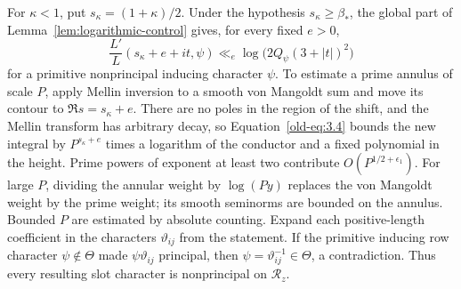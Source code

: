 \documentclass[12pt]{article}
\begin{document}
For \(\kappa<1\), put \(s_\kappa=(1+\kappa)/2\).  Under the hypothesis
\(s_\kappa\ge\beta_*\), the global part of
Lemma~\ref{lem:logarithmic-control} gives, for every fixed \(e>0\),
\begin{equation}
 \frac{L'}{L}(s_\kappa+e+it,\psi)
 \ll_e \log\!\bigl(2Q_\psi(3+|t|)^2\bigr)
 \label{old-eq:3.4}
\end{equation}
for a primitive nonprincipal inducing character \(\psi\).
To estimate a prime annulus of scale \(P\), apply Mellin inversion to
a smooth von Mangoldt sum and move its contour to
\(\Re s=s_\kappa+e\).  There are no poles in the region of the shift,
and the Mellin transform has arbitrary decay, so
Equation~\eqref{old-eq:3.4} bounds the new integral by
\(P^{s_\kappa+e}\) times a logarithm of the conductor and a fixed
polynomial in the height.  Prime powers of exponent at least two
contribute \(O(P^{1/2+\epsilon_1})\).  For large \(P\), dividing the
annular weight by \(\log(Py)\) replaces the von Mangoldt weight by
the prime weight; its smooth seminorms are bounded on the annulus.
Bounded \(P\) are estimated by absolute counting.  Expand each
positive-length coefficient in the characters \(\vartheta_{ij}\)
from the statement.  If the primitive inducing row character
\(\psi\notin\Theta\) made \(\psi\vartheta_{ij}\) principal, then
\(\psi=\vartheta_{ij}^{-1}\in\Theta\), a contradiction.  Thus
every resulting slot character is nonprincipal on \(\mathcal R_z\).
\end{document}
